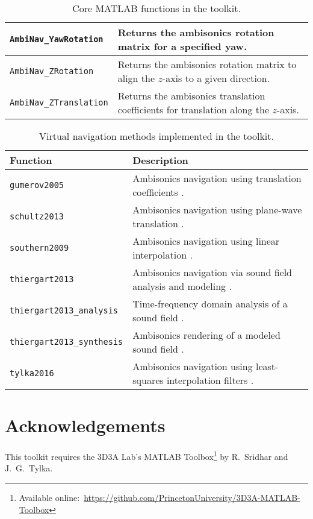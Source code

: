 \documentclass[11pt, oneside]{article}
\begin{document}
\begin{table}
\begin{tabular}{| l | p{11cm} |}
    \texttt{AmbiNav\_YawRotation} & Returns the ambisonics rotation matrix for a specified yaw. \\ \hline
    \texttt{AmbiNav\_ZRotation} & Returns the ambisonics rotation matrix to align the $z$-axis to a given direction. \\ \hline
    \texttt{AmbiNav\_ZTranslation} & Returns the ambisonics translation coefficients for translation along the $z$-axis. \\ \hline
    \end{tabular}
    \caption{Core MATLAB functions in the toolkit.}
    \label{tab:Functions}
\end{table}

\begin{table}
\centering
  \begin{tabular}{| l | p{11cm} |}
    \hline
    \textbf{Function} & \textbf{Description} \\ \hline
    \texttt{gumerov2005} & Ambisonics navigation using translation coefficients \citep{GumerovDuraiswami2005,Zotter2009PhD}. \\ \hline
    \texttt{schultz2013} & Ambisonics navigation using plane-wave translation \citep{SchultzSpors2013}. \\ \hline
    \texttt{southern2009} & Ambisonics navigation using linear interpolation \citep{Southern2009}. \\ \hline
    \texttt{thiergart2013} & Ambisonics navigation via sound field analysis and modeling \citep{Thiergart2013}. \\ \hline
    \texttt{thiergart2013\_analysis} & Time-frequency domain analysis of a sound field \citep{Thiergart2013}. \\ \hline
    \texttt{thiergart2013\_synthesis} & Ambisonics rendering of a modeled sound field \citep{Thiergart2013}. \\ \hline
    \texttt{tylka2016} & Ambisonics navigation using least-squares interpolation filters \citep{TylkaChoueiri2016}. \\ \hline
    \end{tabular}
    \caption{Virtual navigation methods implemented in the toolkit.}
    \label{tab:Methods}
\end{table}

\section*{Acknowledgements}
This toolkit requires the 3D3A Lab's MATLAB Toolbox\footnote{Available online:~\url{https://github.com/PrincetonUniversity/3D3A-MATLAB-Toolbox}}
by R.~Sridhar and J.~G.~Tylka.



\end{document}
